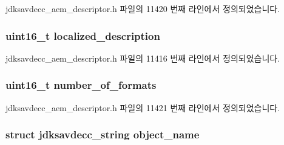 jdksavdecc\+\_\+aem\+\_\+descriptor.\+h 파일의 11420 번째 라인에서 정의되었습니다.

\subsubsection[{\texorpdfstring{localized\+\_\+description}{localized_description}}]{\setlength{\rightskip}{0pt plus 5cm}uint16\+\_\+t localized\+\_\+description}\hypertarget{structjdksavdecc__descriptor__stream_a0926f846ca65a83ad5bb06b4aff8f408}{}\label{structjdksavdecc__descriptor__stream_a0926f846ca65a83ad5bb06b4aff8f408}


jdksavdecc\+\_\+aem\+\_\+descriptor.\+h 파일의 11416 번째 라인에서 정의되었습니다.

\subsubsection[{\texorpdfstring{number\+\_\+of\+\_\+formats}{number_of_formats}}]{\setlength{\rightskip}{0pt plus 5cm}uint16\+\_\+t number\+\_\+of\+\_\+formats}\hypertarget{structjdksavdecc__descriptor__stream_a94e1bc90e2d9a472f293ef6a68702001}{}\label{structjdksavdecc__descriptor__stream_a94e1bc90e2d9a472f293ef6a68702001}


jdksavdecc\+\_\+aem\+\_\+descriptor.\+h 파일의 11421 번째 라인에서 정의되었습니다.

\subsubsection[{\texorpdfstring{object\+\_\+name}{object_name}}]{\setlength{\rightskip}{0pt plus 5cm}struct {\bf jdksavdecc\+\_\+string} object\+\_\+name}\hypertarget{structjdksavdecc__descriptor__stream_a7d1f5945a13863b1762fc6db74fa8f80}{}\label{structjdksavdecc__descriptor__stream_a7d1f5945a13863b1762fc6db74fa8f80}


